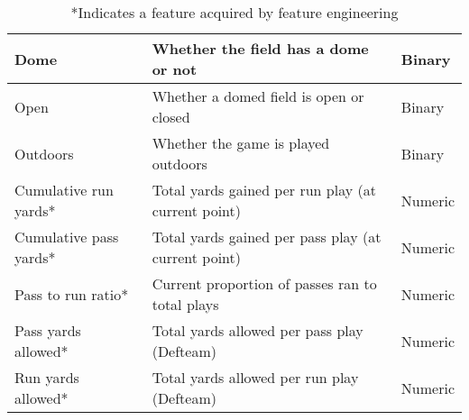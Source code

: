 \documentclass[11pt]{article}
\begin{document}
\begin{table*}[ht]
\begin{tabular}{|| m{4cm} | m{10cm}| m{2cm} ||}
                Dome & Whether the field has a dome or not & Binary \\
                \hline 
                Open & Whether a domed field is open or closed & Binary \\
                \hline 
                Outdoors & Whether the game is played outdoors & Binary \\
                \hline 
                Cumulative run yards* & Total yards gained per run play (at current point) & Numeric  \\
                \hline 
                Cumulative pass yards* & Total yards gained per pass play (at current point) & Numeric \\
                \hline
                Pass to run ratio* & Current proportion of passes ran to total plays & Numeric \\
                \hline
                Pass yards allowed* & Total yards allowed per pass play (Defteam) & Numeric \\
                \hline
                Run yards allowed* & Total yards allowed per run play (Defteam) & Numeric \\
                \hline
            \end{tabular}
            \\[11pt]
            \caption*{*Indicates a feature acquired by feature engineering}
            \end{table*}
        
\end{document}

